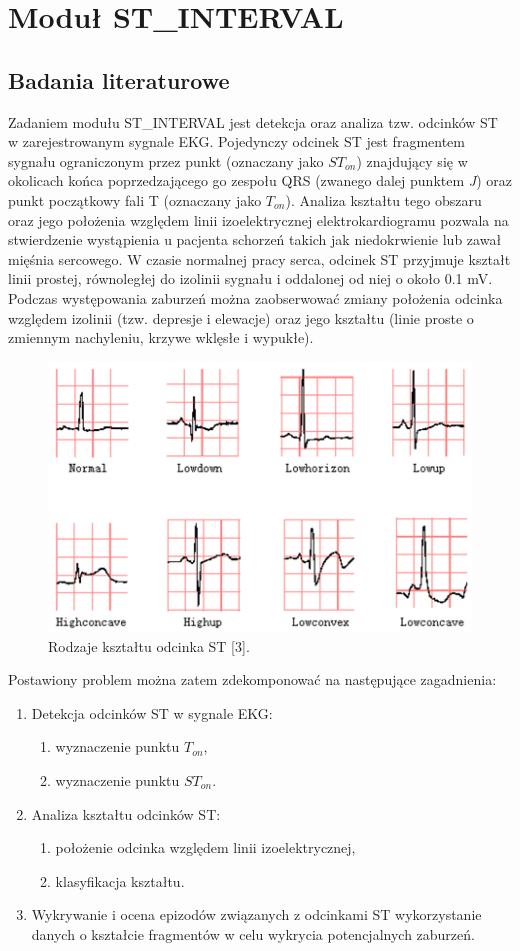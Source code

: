 \section{Moduł ST\_INTERVAL}
\subsection{Badania literaturowe}
Zadaniem modułu ST\_INTERVAL jest detekcja oraz analiza tzw. odcinków ST w zarejestrowanym sygnale EKG. Pojedynczy odcinek ST jest fragmentem sygnału ograniczonym przez punkt (oznaczany jako $ ST_{on} $) znajdujący się w okolicach końca poprzedzającego go zespołu QRS (zwanego dalej punktem \emph{J}) oraz punkt początkowy fali T (oznaczany jako $ T_{on} $). Analiza kształtu tego obszaru oraz jego położenia względem linii izoelektrycznej elektrokardiogramu pozwala na stwierdzenie wystąpienia u pacjenta schorzeń takich jak niedokrwienie lub zawał mięśnia sercowego. W czasie normalnej pracy serca, odcinek ST przyjmuje kształt linii prostej, równoległej do izolinii sygnału i oddalonej od niej o około 0.1 mV.  Podczas występowania zaburzeń można zaobserwować zmiany położenia odcinka względem izolinii (tzw. depresje i elewacje) oraz jego kształtu (linie proste o zmiennym nachyleniu, krzywe wklęsłe i wypukłe).
\begin{figure}[H]
	\centering
	\includegraphics{ST_INTERVAL/img/ST_rodzajeST.png}
	\caption{Rodzaje kształtu odcinka ST [3].}
	\label{fig:ST_rodzajeST}
\end{figure}
Postawiony problem można zatem zdekomponować na następujące zagadnienia:
\begin{enumerate}
	\item Detekcja odcinków ST w sygnale EKG:
	\begin{enumerate}
		\item wyznaczenie punktu $ T_{on} $,
		\item wyznaczenie punktu $ ST_{on} $.
	\end{enumerate}
	\item Analiza kształtu odcinków ST:
	\begin{enumerate}
		\item położenie odcinka względem linii izoelektrycznej,
		\item klasyfikacja kształtu.
	\end{enumerate}
	\item Wykrywanie i ocena epizodów związanych z odcinkami ST wykorzystanie danych o kształcie fragmentów w celu wykrycia potencjalnych zaburzeń.
\end{enumerate}

